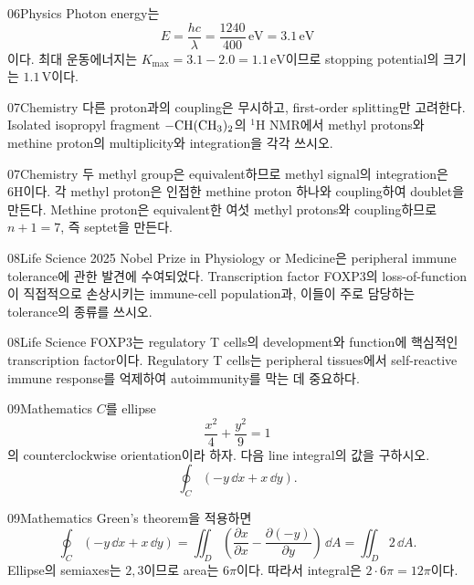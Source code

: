 \documentclass[12pt,aspectratio=169]{beamer}
\begin{document}
\begin{solutionframe}{06}{Physics}
Photon energy는
\[
E=\frac{hc}{\lambda}=\frac{1240}{400}\,\mathrm{eV}=3.1\,\mathrm{eV}
\]
이다. 최대 운동에너지는 $K_{\max}=3.1-2.0=1.1\,\mathrm{eV}$이므로 stopping potential의 크기는 $1.1\,\mathrm{V}$이다.
\end{solutionframe}

\begin{problemframe}{07}{Chemistry}
다른 proton과의 coupling은 무시하고, first-order splitting만 고려한다. Isolated isopropyl fragment $\ce{-CH(CH3)2}$의 $^{1}\mathrm H$ NMR에서 methyl protons와 methine proton의 multiplicity와 integration을 각각 쓰시오.
\end{problemframe}

\begin{solutionframe}{07}{Chemistry}
두 methyl group은 equivalent하므로 methyl signal의 integration은 $6\mathrm H$이다. 각 methyl proton은 인접한 methine proton 하나와 coupling하여 doublet을 만든다. Methine proton은 equivalent한 여섯 methyl protons와 coupling하므로 $n+1=7$, 즉 septet을 만든다.
\end{solutionframe}

\begin{problemframe}{08}{Life Science}
2025 Nobel Prize in Physiology or Medicine은 peripheral immune tolerance에 관한 발견에 수여되었다. Transcription factor FOXP3의 loss-of-function이 직접적으로 손상시키는 immune-cell population과, 이들이 주로 담당하는 tolerance의 종류를 쓰시오.
\end{problemframe}

\begin{solutionframe}{08}{Life Science}
FOXP3는 regulatory T cells의 development와 function에 핵심적인 transcription factor이다. Regulatory T cells는 peripheral tissues에서 self-reactive immune response를 억제하여 autoimmunity를 막는 데 중요하다.
\end{solutionframe}

\begin{problemframe}{09}{Mathematics}
$C$를 ellipse
\[
\frac{x^2}{4}+\frac{y^2}{9}=1
\]
의 counterclockwise orientation이라 하자. 다음 line integral의 값을 구하시오.
\[
\oint_C (-y\,\dd x+x\,\dd y).
\]
\end{problemframe}

\begin{solutionframe}{09}{Mathematics}
\answerbox{$\displaystyle 12\pi$}
Green's theorem을 적용하면
\[
\oint_C (-y\,\dd x+x\,\dd y)
=\iint_D\left(\frac{\partial x}{\partial x}-\frac{\partial(-y)}{\partial y}\right)\,\dd A
=\iint_D 2\,\dd A.
\]
Ellipse의 semiaxes는 $2,3$이므로 area는 $6\pi$이다. 따라서 integral은 $2\cdot6\pi=12\pi$이다.
\end{solutionframe}
\end{document}
